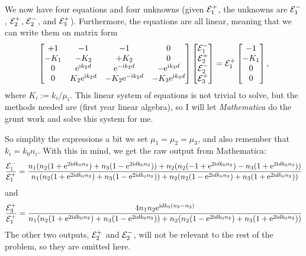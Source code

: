 \documentclass[11pt,letter, swedish, english
]{article}
\begin{document}
We now have four equations and four unknowns (given ${\mathcal{E}_1^+}$, the
unknowns are ${\mathcal{E}_1^-}$, ${\mathcal{E}_2^+}$, ${\mathcal{E}_2^-}$, and ${\mathcal{E}_3^+}$). Furthermore, the
equations are all linear, meaning that we can write them on matrix
form
\begin{equation}\label{eq:1_master_eqn}
\begin{bmatrix}
+1 & -1 & -1 & 0 \\
-K_1 & -K_2 & +K_2 &0\\
0& \mathrm{e}^{\mathrm{i} k_2d}& \mathrm{e}^{-\mathrm{i} k_2d}& -\mathrm{e}^{\mathrm{i} k_3d}\\
0& K_2\mathrm{e}^{\mathrm{i} k_2d}& -K_2\mathrm{e}^{-\mathrm{i} k_2d}& -K_3\mathrm{e}^{\mathrm{i} k_3d}\\
\end{bmatrix}
\begin{bmatrix}
{\mathcal{E}_1^-} \\ {\mathcal{E}_2^+} \\ {\mathcal{E}_2^-} \\ {\mathcal{E}_3^+}
\end{bmatrix}
= {\mathcal{E}_1^+}
\begin{bmatrix}
-1 \\ -K_1 \\ 0 \\ 0
\end{bmatrix},
\end{equation}
where $K_i:=k_i/\mu_i$. This linear system of equations is not trivial
to solve, but the methods needed are (first year linear algebra), so I
will let \textit{Mathematica} do the grunt work and solve this system
for me. 

So simplity the expressions a bit we set $\mu_1=\mu_2=\mu_3$, and also
remember that $k_i=k_0n_i$. With this in mind, we get the raw output
from Mathematica:
\begin{equation}\label{eq:1_Em}
\frac{{\mathcal{E}_1^-}}{{\mathcal{E}_1^+}}=
\frac{
n_1 (n_2(1 + \mathrm{e}^{2\mathrm{i} dk_0n_2}) + n_3(1 - \mathrm{e}^{2\mathrm{i} dk_0n_2})) + 
 n_2 (n_2(-1 + \mathrm{e}^{2\mathrm{i} dk_0n_2}) - n_3(1 + \mathrm{e}^{2\mathrm{i} dk_0n_2}))
}{
n_1 (n_2(1 + \mathrm{e}^{2\mathrm{i} dk_0n_2}) + n_3(1 - \mathrm{e}^{2\mathrm{i} dk_0n_2})) + 
 n_2 (n_2(1 - \mathrm{e}^{2\mathrm{i} dk_0n_2}) + n_3(1 + \mathrm{e}^{2\mathrm{i} dk_0n_2}))
}
\end{equation}
and 
\begin{equation}\label{eq:1_Eppp}
\frac{{\mathcal{E}_3^+}}{{\mathcal{E}_1^+}} = 
\frac{
4n_1n_2 \mathrm{e}^{\mathrm{i} d k_0(n_2-n_3)}
}{
n_1 (n_2(1 + \mathrm{e}^{2\mathrm{i} dk_0n_2}) + n_3(1 - \mathrm{e}^{2\mathrm{i} dk_0n_2})) + 
 n_2 (n_2(1 - \mathrm{e}^{2\mathrm{i} dk_0n_2}) + n_3(1 + \mathrm{e}^{2\mathrm{i} dk_0n_2}))
}
\end{equation}
The other two outputs, ${\mathcal{E}_2^+}$ and ${\mathcal{E}_2^-}$, will not be relevant to the
rest of the problem, so they are omitted here. 
\end{document}
